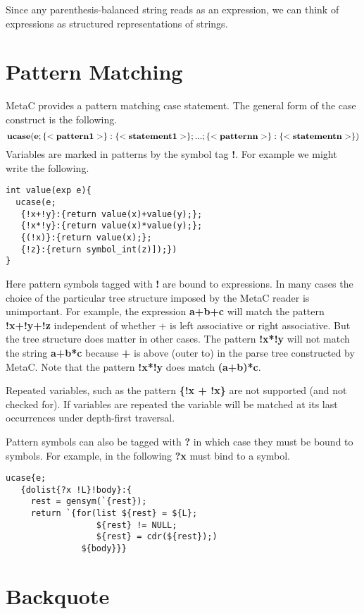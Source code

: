 \documentclass{article}
\begin{document}
Since any parenthesis-balanced string reads as an expression, we can think of expressions as structured representations of strings.

\section{Pattern Matching}

MetaC provides a pattern matching case statement.
The general form of the case construct is the following.
$${\bf ucase(e; \{<pattern1>\}:\{<statement1>\}; ... ;\{<patternn>\}:\{<statementn>\})}$$
Variables are marked in patterns by the symbol tag {\bf !}. For example we might write the following.

\begin{verbatim}
int value(exp e){
  ucase(e;
   {!x+!y}:{return value(x)+value(y);};
   {!x*!y}:{return value(x)*value(y);};
   {(!x)}:{return value(x);};
   {!z}:{return symbol_int(z)]);})
}
\end{verbatim}

Here pattern symbols tagged with {\bf !} are bound to expressions. In many cases the choice of the particular tree structure imposed by the MetaC reader is unimportant.  For example, the expression {\bf a+b+c} will match the pattern
{\bf !x+!y+!z} independent of whether + is left associative or right associative.  But the tree structure does matter in other cases.  The pattern {\bf !x*!y}
will not match the string {\bf a+b*c} because {\bf +} is above (outer to) {\bf *} in the parse tree constructed by MetaC. Note that the pattern {\bf !x*!y} does match {\bf (a+b)*c}.

Repeated variables, such as the pattern {\bf \{!x + !x\}} are not supported (and not checked for).  If variables are repeated the variable will be matched at its last occurrences under depth-first traversal.

Pattern symbols can also be tagged with {\bf ?} in which case they must be bound to symbols.  For example, in the following {\bf ?x} must bind to a symbol.

\begin{verbatim}
ucase{e;
   {dolist{?x !L}!body}:{
     rest = gensym(`{rest});
     return `{for(list ${rest} = ${L};
                  ${rest} != NULL;
                  ${rest} = cdr(${rest});)
               ${body}}}
\end{verbatim}

\section{Backquote}
\end{document}
